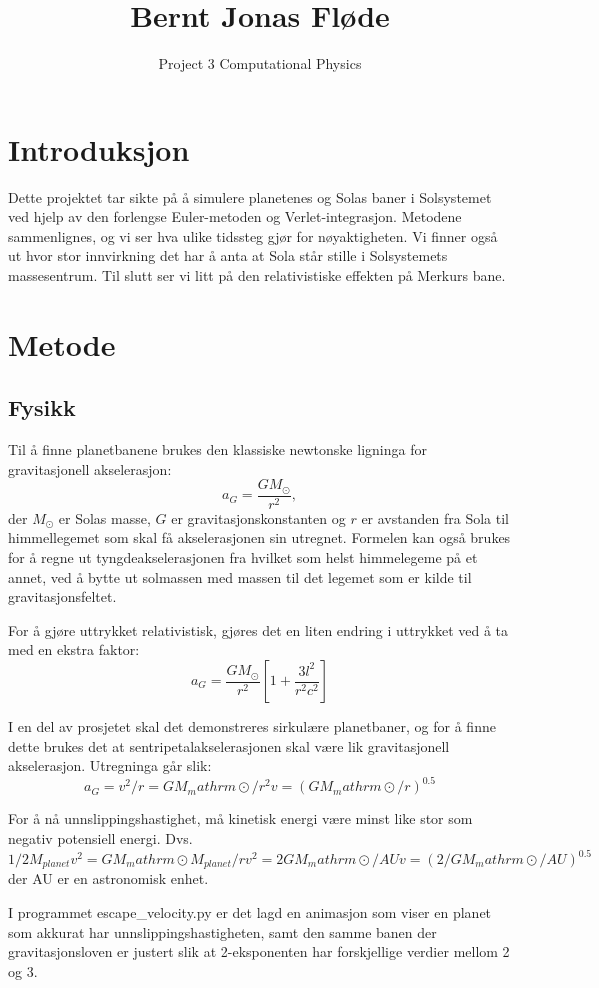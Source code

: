 \documentclass[a4paper,10pt,english]{article}
\title{Bernt Jonas Fløde
}
\author{Project 3 Computational Physics
}
\begin{document}
\maketitle

\section*{Introduksjon}
Dette projektet tar sikte på å simulere planetenes og
Solas baner i Solsystemet ved hjelp av den forlengse
Euler-metoden og Verlet-integrasjon. Metodene sammenlignes,
og vi ser hva ulike tidssteg gjør for nøyaktigheten. Vi
finner også ut hvor stor innvirkning det har å anta at
Sola står stille i Solsystemets massesentrum. Til slutt
ser vi litt på den relativistiske effekten på Merkurs bane.

\section*{Metode}
\subsection*{Fysikk}
Til å finne planetbanene brukes den klassiske
newtonske ligninga for gravitasjonell akselerasjon:
\[
a_G= \frac{GM_{\odot}}{r^2},
\]
der $M_{\odot}$ er Solas masse, $G$ er
gravitasjonskonstanten og $r$ er avstanden fra Sola til
himmellegemet som skal få akselerasjonen sin utregnet.
Formelen kan også brukes for å regne ut
tyngdeakselerasjonen fra hvilket som helst himmelegeme
på et annet, ved å bytte ut solmassen med massen til det
legemet som er kilde til gravitasjonsfeltet.

For å gjøre uttrykket relativistisk, gjøres det en liten
endring i uttrykket ved å ta med en ekstra faktor:
\[
a_G = \frac{GM_\mathrm{\odot}}{r^2}\left[1 + \frac{3l^2}{r^2c^2}\right]
\]

I en del av prosjetet skal det demonstreres sirkulære planetbaner, og for å
finne dette brukes det at sentripetalakselerasjonen skal være lik gravitasjonell
akselerasjon. Utregninga går slik:
\[
a_G = v^2 / r = G M_mathrm{\odot} / r^2
v = (G M_mathrm{\odot} / r)^{0.5}
\]

For å nå unnslippingshastighet, må kinetisk energi være minst like stor som
negativ potensiell energi. Dvs.
\[
1/2 M_{planet} v^2 = G M_mathrm{\odot} M_{planet} / r
v^2 = 2 G M_mathrm{\odot} / AU
v = (2 / G M_mathrm{\odot} / AU)^{0.5}
\]
der AU er en astronomisk enhet.

I programmet escape\_velocity.py er det lagd en animasjon som viser en planet
som akkurat har unnslippingshastigheten, samt den samme banen der
gravitasjonsloven er justert slik at 2-eksponenten har forskjellige verdier
mellom 2 og 3.
\end{document}
